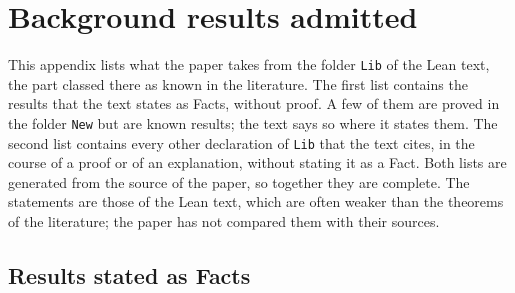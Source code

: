 \section{Background results admitted}\label{sec:app-facts}

This appendix lists what the paper takes from the folder \texttt{Lib} of the Lean text,
the part classed there as known in the literature. The first list contains the results
that the text states as Facts, without proof. A few of them are proved in the folder
\texttt{New} but are known results; the text says so where it states them. The second
list contains every other declaration of \texttt{Lib} that the text cites, in the
course of a proof or of an explanation, without stating it as a Fact. Both lists are
generated from the source of the paper, so together they are complete. The statements
are those of the Lean text, which are often weaker than the theorems of the
literature; the paper has not compared them with their sources.

\subsection*{Results stated as Facts}


